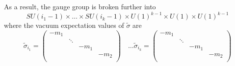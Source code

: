 As a result, the gauge group is broken further into
\begin{equation}
SU(i_1 -1 ) \times \dots \times SU(i_k -1 ) \times U(1)^{k-1} \times U(1)\times U(1)^{k-1}
\end{equation}
where the vacuum expectation values of $\tilde{\sigma}$ are 
\begin{equation}
\tilde{\sigma}_{i_1} = 
\begin{pmatrix}
 - m_1 & \\
  & \ddots  \\
  & & - m_1 & \\
  & & & - m_2 \\
\end{pmatrix}
\quad \dots 
\tilde{\sigma}_{i_k} = 
\begin{pmatrix}
 - m_1 & \\
  & \ddots  \\
  & & - m_1 & \\
  & & & - m_2 \\
\end{pmatrix}
\end{equation}




























